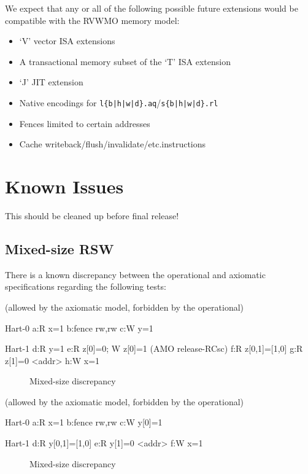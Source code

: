 We expect that any or all of the following possible future extensions would be compatible with the RVWMO memory model:

\begin{itemize}
  \item `V' vector ISA extensions
  \item A transactional memory subset of the `T' ISA extension
  \item `J' JIT extension
  \item Native encodings for {\tt l\{b|h|w|d\}.aq}/{\tt s\{b|h|w|d\}.rl}
  \item Fences limited to certain addresses
  \item Cache writeback/flush/invalidate/etc.\@ instructions
\end{itemize}

\section{Known Issues}
\label{sec:memory:discrepancies}

\begin{commentary}
  This should be cleaned up before final release!
\end{commentary}

\subsection{Mixed-size RSW}

There is a known discrepancy between the operational and axiomatic specifications regarding the following tests:

\begin{verbbox}
(allowed by the axiomatic model, forbidden by the operational)

Hart-0
a:R x=1
b:fence rw,rw
c:W y=1

Hart-1
d:R y=1
e:R z[0]=0; W z[0]=1 (AMO release-RCsc)
f:R z[0,1]=[1,0]
g:R z[1]=0
  <addr>
h:W x=1
\end{verbbox}
\begin{figure}[h!]
  \centering\small
  \theverbbox
  \caption{Mixed-size discrepancy}
  \label{fig:litmus:discrepancy:rsw1}
\end{figure}

\begin{verbbox}
(allowed by the axiomatic model, forbidden by the operational)

Hart-0
a:R x=1
b:fence rw,rw
c:W y[0]=1

Hart-1
d:R y[0,1]=[1,0]
e:R y[1]=0
  <addr>
f:W x=1
\end{verbbox}
\begin{figure}[h!]
  \centering\small
  \theverbbox
  \caption{Mixed-size discrepancy}
  \label{fig:litmus:discrepancy:rsw2}
\end{figure}

